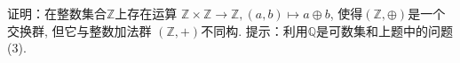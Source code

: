\begin{solution}
    
\end{solution}

\begin{problem}
    证明：在整数集合$\mathbb{Z}$上存在运算
$\mathbb{Z} \times \mathbb{Z} \to \mathbb{Z}, (a,b) \mapsto a \oplus b$,
使得$(\mathbb{Z}, \oplus)$是一个交换群, 但它与整数加法群
$(\mathbb{Z}, +)$不同构. 提示：利用$\mathbb{Q}$是可数集和上题中的问题(3).
\end{problem}

\begin{solution}
    
\end{solution}